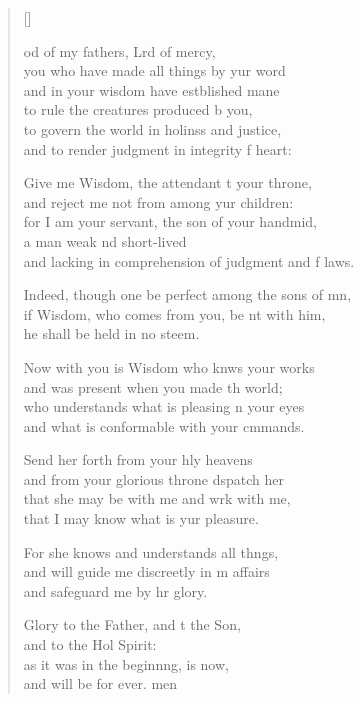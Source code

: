 \settowidth{\versewidth}{Indeed, though one be perfect among the sons of men, +}
\begin{verse}[\versewidth]
  \begin{patverse}
od of my fathers, Lrd of mercy,\Med\\
you who have made all things by yur word\\
and in your wisdom have estblished mane\Med\\
to rule the creatures produced b you,\\
to govern the world in holinss and justice,\Med\\
and to render judgment in integrity f heart:

Give me Wisdom, the attendant t your throne,\Med\\
and reject me not from among yur children:\\
for I am your servant, the son of your handmid,\Flex\\
a man weak nd short-lived\Med\\
and lacking in comprehension of judgment and f laws.

Indeed, though one be perfect among the sons of mn,\Flex\\
if Wisdom, who comes from you, be nt with him,\Med\\
he shall be held in no steem.

Now with you is Wisdom who knws your works\Med\\
and was present when you made th world;\\
who understands what is pleasing \pointup{\i}n your eyes\Med\\
and what is conformable with your cmmands.

Send her forth from your hly heavens\Med\\
and from your glorious throne d\pointup{\i}spatch her\\
that she may be with me and wrk with me,\Med\\
that I may know what is yur pleasure.

For she knows and understands all th\pointup{\i}ngs,\Flex\\
and will guide me discreetly in m affairs\Med\\
and safeguard me by hr glory.

Glory to the Father, and t the Son,\Med\\
and to the Hol Spirit:\\
as it was in the beginn\pointup{\i}ng, is now,\Med\\
and will be for ever. men
  \end{patverse}
\end{verse}
